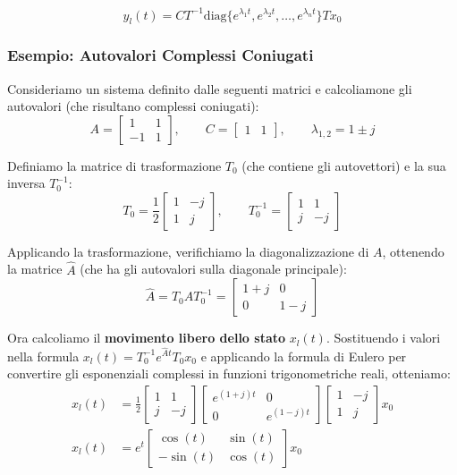 \documentclass[a4paper,12pt]{article}
\begin{document}
	\[
	y_l(t) = C T^{-1} \text{diag}\{ e^{\lambda_1 t}, e^{\lambda_2 t}, \dots, e^{\lambda_n t} \} T x_0
	\]
	
	\vspace{0.5cm}
	
	\subsubsection*{Esempio: Autovalori Complessi Coniugati}
	
	Consideriamo un sistema definito dalle seguenti matrici e calcoliamone gli autovalori (che risultano complessi coniugati):
	\[
	A = \begin{bmatrix} 1 & 1 \\ -1 & 1 \end{bmatrix}, \qquad 
	C = \begin{bmatrix} 1 & 1 \end{bmatrix}, \qquad 
	\lambda_{1,2} = 1 \pm j
	\]
	
	Definiamo la matrice di trasformazione $T_0$ (che contiene gli autovettori) e la sua inversa $T_0^{-1}$:
	\[
	T_0 = \frac{1}{2} \begin{bmatrix} 1 & -j \\ 1 & j \end{bmatrix}, \qquad 
	T_0^{-1} = \begin{bmatrix} 1 & 1 \\ j & -j \end{bmatrix}
	\]
	
	Applicando la trasformazione, verifichiamo la diagonalizzazione di $A$, ottenendo la matrice $\hat{A}$ (che ha gli autovalori sulla diagonale principale):
	\[
	\hat{A} = T_0 A T_0^{-1} = \begin{bmatrix} 1+j & 0 \\ 0 & 1-j \end{bmatrix}
	\]
	
	Ora calcoliamo il \textbf{movimento libero dello stato} $x_l(t)$. 
	Sostituendo i valori nella formula $x_l(t) = T_0^{-1} e^{\hat{A}t} T_0 x_0$ e applicando la formula di Eulero per convertire gli esponenziali complessi in funzioni trigonometriche reali, otteniamo:
	\begin{align*}
		x_l(t) &= \frac{1}{2} \begin{bmatrix} 1 & 1 \\ j & -j \end{bmatrix} \begin{bmatrix} e^{(1+j)t} & 0 \\ 0 & e^{(1-j)t} \end{bmatrix} \begin{bmatrix} 1 & -j \\ 1 & j \end{bmatrix} x_0 \\[10pt]
		x_l(t) &= e^t \begin{bmatrix} \cos(t) & \sin(t) \\ -\sin(t) & \cos(t) \end{bmatrix} x_0
	\end{align*}
	
\end{document}
